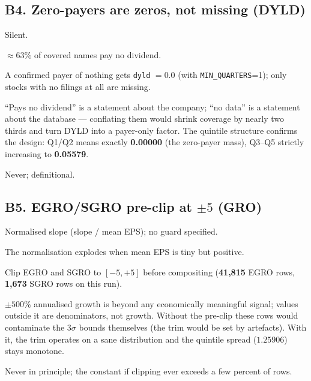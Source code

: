 \documentclass[11pt,a4paper]{article}
\begin{document}
\subsection{B4. Zero-payers are zeros, not missing (DYLD)}

\begin{description}[style=nextline]
  \item[USE4] Silent.
  \item[Deviation] $\approx 63\%$ of covered names pay no dividend.
  \item[Solution] A confirmed payer of nothing gets \texttt{dyld} $=0.0$
    (with \texttt{MIN\_QUARTERS}=1); only stocks with no filings at all are
    missing.
  \item[Validity] ``Pays no dividend'' is a statement about the company;
    ``no data'' is a statement about the database --- conflating them would
    shrink coverage by nearly two thirds and turn DYLD into a payer-only
    factor. The quintile structure confirms the design: Q1/Q2 means exactly
    \textbf{0.00000} (the zero-payer mass), Q3--Q5 strictly increasing to
    \textbf{0.05579}.
  \item[Revisit when] Never; definitional.
\end{description}

\subsection{B5. EGRO/SGRO pre-clip at $\pm 5$ (GRO)}

\begin{description}[style=nextline]
  \item[USE4] Normalised slope (slope / mean EPS); no guard specified.
  \item[Deviation] The normalisation explodes when mean EPS is tiny but
    positive.
  \item[Solution] Clip EGRO and SGRO to $[-5,+5]$ before compositing
    (\textbf{41{,}815} EGRO rows, \textbf{1{,}673} SGRO rows on this run).
  \item[Validity] $\pm 500\%$ annualised growth is beyond any economically
    meaningful signal; values outside it are denominators, not growth. Without
    the pre-clip these rows would contaminate the 3$\sigma$ bounds themselves
    (the trim would be set by artefacts). With it, the trim operates on a sane
    distribution and the quintile spread ($1.25906$) stays monotone.
  \item[Revisit when] Never in principle; the constant if clipping ever
    exceeds a few percent of rows.
\end{description}
\end{document}
